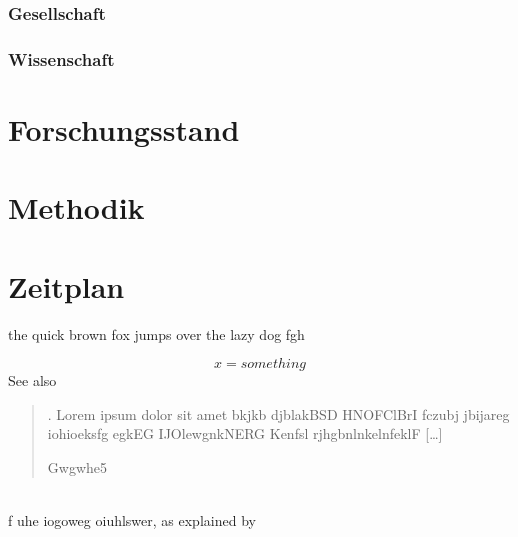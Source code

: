 \documentclass[12pt,a4paper]{article}        %
\begin{document}
    \subsubsection{Gesellschaft}
    \subsubsection{Wissenschaft}
    \section{Forschungsstand}
    \section{Methodik}
    \pagebreak
    \section{Zeitplan}

    the quick brown fox jumps over the lazy dog
    fgh\smartcite[1-500, 28]{eg34} %
    
    \[x=something\]
    See also \cite{eg34}
    \blockquote[Gwgwhe5]{. Lorem ipsum dolor sit amet  bkjkb djblakBSD HNOFClBrI fczubj jbijareg iohioeksfg egkEG IJOlewgnkNERG Kenfsl rjhgbnlnkelnfeklF […]} \parencite[22]{eg34}\\ %
    f uhe iogoweg oiuhlswer, as explained by \textcite{eg34}


\pagebreak

\printbibliography[heading=bibintoc, title={References}]  %
\end{document}
